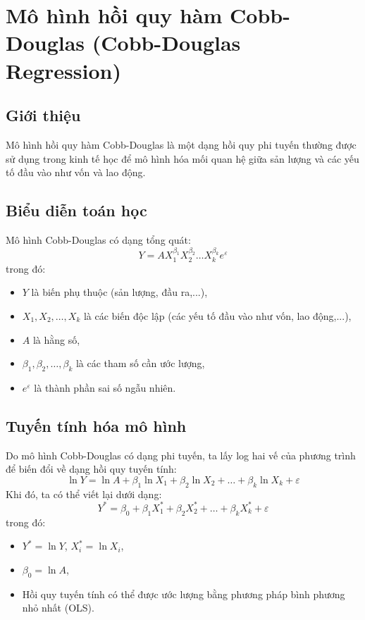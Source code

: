 \chapter{Mô hình hồi quy hàm Cobb-Douglas (Cobb-Douglas Regression)}
\section{Giới thiệu}
Mô hình hồi quy hàm Cobb-Douglas là một dạng hồi quy phi tuyến thường được sử dụng trong kinh tế học để mô hình hóa mối quan hệ giữa sản lượng và các yếu tố đầu vào như vốn và lao động.

\section{Biểu diễn toán học}
Mô hình Cobb-Douglas có dạng tổng quát:
\begin{equation}
    Y = A X_1^{\beta_1} X_2^{\beta_2} \dots X_k^{\beta_k} e^{\varepsilon}
\end{equation}
trong đó:
\begin{itemize}
    \item $Y$ là biến phụ thuộc (sản lượng, đầu ra,...),
    \item $X_1, X_2, \dots, X_k$ là các biến độc lập (các yếu tố đầu vào như vốn, lao động,...),
    \item $A$ là hằng số,
    \item $\beta_1, \beta_2, \dots, \beta_k$ là các tham số cần ước lượng,
    \item $e^{\varepsilon}$ là thành phần sai số ngẫu nhiên.
\end{itemize}

\section{Tuyến tính hóa mô hình}
Do mô hình Cobb-Douglas có dạng phi tuyến, ta lấy log hai vế của phương trình để biến đổi về dạng hồi quy tuyến tính:
\begin{equation}
    \ln Y = \ln A + \beta_1 \ln X_1 + \beta_2 \ln X_2 + \dots + \beta_k \ln X_k + \varepsilon
\end{equation}
Khi đó, ta có thể viết lại dưới dạng:
\begin{equation}
    Y^* = \beta_0 + \beta_1 X_1^* + \beta_2 X_2^* + \dots + \beta_k X_k^* + \varepsilon
\end{equation}
trong đó:
\begin{itemize}
    \item $Y^* = \ln Y$, $X_i^* = \ln X_i$,
    \item $\beta_0 = \ln A$,
    \item Hồi quy tuyến tính có thể được ước lượng bằng phương pháp bình phương nhỏ nhất (OLS).
\end{itemize}

